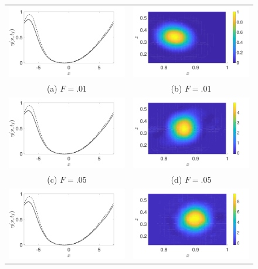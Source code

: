 \documentclass[a4paper,11pt]{article}
\begin{document}
\begin{figure}
\centering
\begin{tabular}{cc}
\includegraphics[width=.35\textwidth]{profiles_wm_1_modu_pt9} & \includegraphics[width=.35\textwidth]{vorticity_wm_1_modu_pt9}\\
(a)  $F=.01$ & (b)  $F=.01$\\
\includegraphics[width=.35\textwidth]{profiles_wm_5_modu_pt9} & \includegraphics[width=.35\textwidth]{vorticity_wm_5_modu_pt9}\\
(c)  $F=.05$ & (d)  $F=.05$\\
\includegraphics[width=.35\textwidth]{profiles_wm_10_modu_pt9} & \includegraphics[width=.35\textwidth]{vorticity_wm_10_modu_pt9}\\

\end{tabular}
\end{figure}
\end{document}
